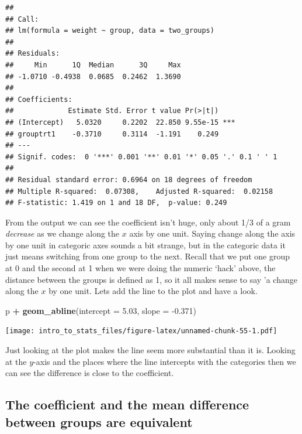 \documentclass[
]{book}
\newenvironment{Shaded}{\begin{snugshade}}{\end{snugshade}}
\newcommand{\DataTypeTok}[1]{\textcolor[rgb]{0.13,0.29,0.53}{#1}}
\newcommand{\FloatTok}[1]{\textcolor[rgb]{0.00,0.00,0.81}{#1}}
\newcommand{\KeywordTok}[1]{\textcolor[rgb]{0.13,0.29,0.53}{\textbf{#1}}}
\newcommand{\NormalTok}[1]{#1}
\newcommand{\OperatorTok}[1]{\textcolor[rgb]{0.81,0.36,0.00}{\textbf{#1}}}
\newcommand{\StringTok}[1]{\textcolor[rgb]{0.31,0.60,0.02}{#1}}
\begin{document}
\begin{verbatim}
## 
## Call:
## lm(formula = weight ~ group, data = two_groups)
## 
## Residuals:
##     Min      1Q  Median      3Q     Max 
## -1.0710 -0.4938  0.0685  0.2462  1.3690 
## 
## Coefficients:
##             Estimate Std. Error t value Pr(>|t|)    
## (Intercept)   5.0320     0.2202  22.850 9.55e-15 ***
## grouptrt1    -0.3710     0.3114  -1.191    0.249    
## ---
## Signif. codes:  0 '***' 0.001 '**' 0.01 '*' 0.05 '.' 0.1 ' ' 1
## 
## Residual standard error: 0.6964 on 18 degrees of freedom
## Multiple R-squared:  0.07308,	Adjusted R-squared:  0.02158 
## F-statistic: 1.419 on 1 and 18 DF,  p-value: 0.249
\end{verbatim}

From the output we can see the coefficient isn't huge, only about 1/3 of a gram \emph{decrease} as we change along the \(x\) axis by one unit. Saying change along the axis by one unit in categoric axes sounds a bit strange, but in the categoric data it just means switching from one group to the next. Recall that we put one group at 0 and the second at 1 when we were doing the numeric `hack' above, the distance between the groups is defined as 1, so it all makes sense to say 'a change along the \(x\) by one unit. Lets add the line to the plot and have a look.

\begin{Shaded}
\begin{Highlighting}[]
\NormalTok{p }\OperatorTok{+}\StringTok{ }\KeywordTok{geom_abline}\NormalTok{(}\DataTypeTok{intercept =} \FloatTok{5.03}\NormalTok{, }\DataTypeTok{slope =} \FloatTok{-0.371}\NormalTok{)}
\end{Highlighting}
\end{Shaded}

\texttt{[image: intro\_to\_stats\_files/figure-latex/unnamed-chunk-55-1.pdf]}

Just looking at the plot makes the line seem more substantial than it is. Looking at the \(y\)-axis and the places where the line intercepts with the categories then we can see the difference is close to the coefficient.

\hypertarget{the-coefficient-and-the-mean-difference-between-groups-are-equivalent}{%
\subsection{The coefficient and the mean difference between groups are equivalent}\label{the-coefficient-and-the-mean-difference-between-groups-are-equivalent}}
\end{document}
